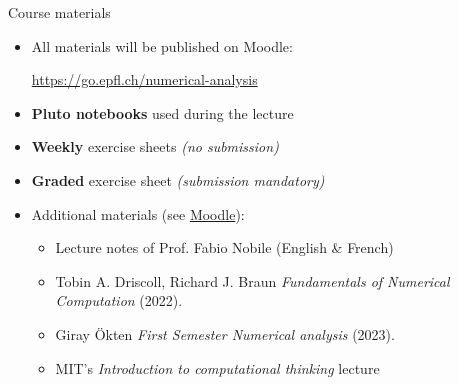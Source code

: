 \begin{frame}{Course materials}
    \begin{itemize}
        \item All materials will be published on \alert{Moodle:}
            \begin{center}
            \url{https://go.epfl.ch/numerical-analysis}
            \end{center}
        \vspace{1em}
        \item \textbf{Pluto notebooks} used during the lecture
        \item \textbf{Weekly} exercise sheets \textit{(no submission)}
        \item \textbf{Graded} exercise sheet \textit{(submission mandatory)}
        \vspace{1em}
        \item Additional materials (see \href{https://go.epfl.ch/numerical-analysis}{Moodle}):
            \begin{itemize}
                \item Lecture notes of Prof. Fabio Nobile (English \& French)
                \item Tobin A. Driscoll, Richard J. Braun
                    \textit{Fundamentals of Numerical Computation} (2022).
                \item Giray Ökten \textit{First Semester Numerical analysis} (2023).
                \item MIT's \textit{Introduction to computational thinking} lecture
            \end{itemize}
    \end{itemize}
\end{frame}

